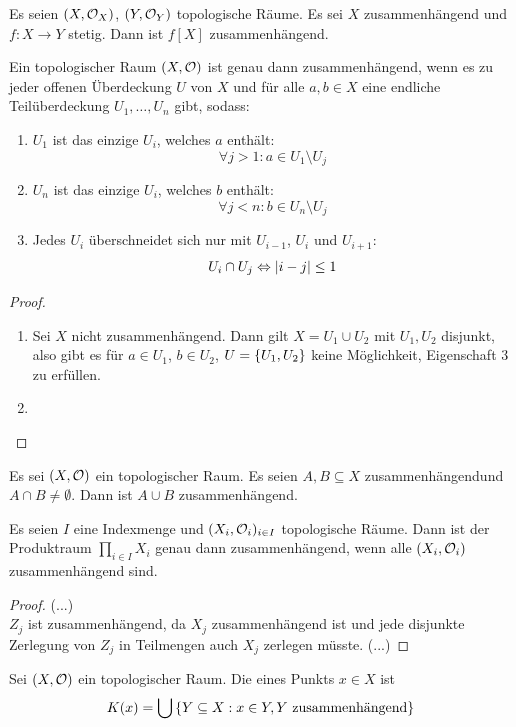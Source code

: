 \documentclass{report}
\begin{document}
\begin{theorem}
	Es seien $(X, \mathcal{O}_X)$, $(Y, \mathcal{O}_Y)$ topologische Räume. Es sei $X$ zusammenhängend und $f : X \to Y$ stetig. Dann ist $f[X]$ zusammenhängend.
\end{theorem}
\begin{lemma}
	Ein topologischer Raum $(X, \mathcal{O})$ ist genau dann zusammenhängend, wenn es zu jeder offenen Überdeckung $U$ von $X$ und für alle $a,b \in X$ eine endliche Teilüberdeckung $U_1, \hdots, U_n$ gibt, sodass:
	\begin{enumerate}
		\item $U_1$ ist das einzige $U_i$, welches $a$ enthält: 
		$$\forall j > 1: a \in U_1 \setminus U_j$$
		\item $U_n$ ist das einzige $U_i$, welches $b$ enthält: 
		$$\forall j < n: b \in U_n \setminus U_j$$
		\item Jedes $U_i$ überschneidet sich nur mit $U_{i-1}$, $U_i$ und $U_{i+1}$:
		$$U_i \cap U_j \Leftrightarrow \abs{i-j} \leq 1$$
	\end{enumerate}
\end{lemma}
\begin{proof}
	\begin{enumerate}
		\item[$\Leftarrow$] Sei $X$ nicht zusammenhängend. Dann gilt $X = U_1 \cup U_2$ mit $U_1, U_2$ disjunkt, also gibt es für $a \in U_1$, $b \in U_2$, $U = \qty{U_1, U_2}$ keine Möglichkeit, Eigenschaft $3$ zu erfüllen.
		\item
	\end{enumerate}
\end{proof}
\begin{theorem}
	Es sei $(X, \mathcal{O})$ ein topologischer Raum. Es seien $A,B \subseteq X$ zusammenhängendund $A \cap B \neq \emptyset$. Dann ist $A \cup B$ zusammenhängend.
\end{theorem}
\begin{theorem}
	Es seien $I$ eine Indexmenge und $(X_i, \mathcal{O}_i)_{i \in I}$ topologische Räume. Dann ist der Produktraum $\prod_{i \in I} X_i$ genau dann zusammenhängend, wenn alle $(X_i, \mathcal{O}_i)$ zusammenhängend sind.
\end{theorem}
\begin{proof}
	(...)\\
	$Z_j$ ist zusammenhängend, da $X_j$ zusammenhängend ist und jede disjunkte Zerlegung von $Z_j$ in Teilmengen auch $X_j$ zerlegen müsste.
	(...)
\end{proof}
\begin{theorem}
	Sei $(X, \mathcal{O})$ ein topologischer Raum.
	Die  eines Punkts $x \in X$ ist
	\begin{align*}
		K(x) = \bigcup \qty{Y \subseteq X : x \in Y, Y \textnormal{ zusammenhängend}}
	\end{align*}
\end{theorem}
\end{document}
